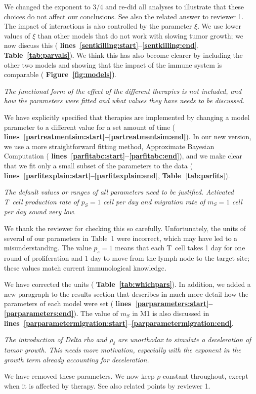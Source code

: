\documentclass{article}
\newcommand{\revr}[1]{{\color{gray} \itshape #1}}
\newcommand{\auth}[1]{{#1}}
\newcommand{\chng}[1]{{\color{blue!70!black} #1}}
\newcommand{\myref}[2]{{\bfseries\color{red!70!black} Figure~\ref{#1}#2}}
\newcommand{\mytref}[1]{{\bfseries\color{red!70!black} Table~\ref{#1}}}
\newcommand{\lr}[1]{{\bfseries\color{red!70!black} lines~\ref{#1:start}--\ref{#1:end}}}
\begin{document}
\chng{We changed the exponent to 3/4 and re-did all analyses to illustrate that these choices do not affect our conclusions. See also the related answer to reviewer 1. The impact of interactions is also controlled by the parameter $\xi$. We use lower values of $\xi$ than other models that do not work with slowing tumor growth; we now discuss this (\lr{sentkilling}, \mytref{tab:parvals}). We think this has also become clearer by including the other two models and showing that the impact of the immune system is comparable (\myref{fig:models}).}

\revr{The functional form of the effect of the different therapies is not included, and how the parameters were fitted and what values they have needs to be discussed.}

\chng{We have explicitly specified that therapies are implemented by changing a model parameter to a different value for a set amount of time
(\lr{partreatmentsim}). In our new version, we use a more straightforward fitting method, Approximate Bayesian Computation (\lr{parfitabc}), and we make clear that we fit only a small subset of the parameters to the data (\lr{parfitexplain},\mytref{tab:parfits}).}

\revr{The default values or ranges of all parameters need to be justified. Activated T~cell production rate of $p_S=1$ cell per day and migration rate of $m_S=1$ cell per day sound very low.}

\auth{We thank the reviewer for checking this so carefully. Unfortunately, the units of several of our parameters in Table~1 were incorrect, which may have led to a misunderstanding. The value $p_s=1$ means that each T~cell takes 1 day for one round of proliferation and 1 day to move from the lymph node to the target site; these values match current immunological knowledge.}

\chng{We have corrected the units (\mytref{tab:whichpars}). In addition, we added a new paragraph to the results section that describes in much more detail how the parameters of each model were set (\lr{parparameters}). The value of $m_S$ in M1 is also discussed in \lr{parparametermigration}.}

\revr{The introduction of Delta rho and $\rho_\delta$ are unorthodox to simulate a deceleration of tumor growth. This needs more motivation, especially with the exponent in the growth term already accounting for deceleration.}

\chng{We have removed these parameters. We now keep $\rho$ constant throughout, except when it is affected by therapy. See also related points by reviewer 1.}
\end{document}
